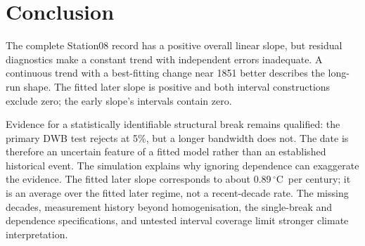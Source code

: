 \documentclass[11pt,a4paper]{article}
\newcommand{\degC}{\ensuremath{^{\circ}\mathrm C}}
\begin{document}
\section{Conclusion}
The complete Station08 record has a positive overall linear slope, but residual diagnostics make a constant trend with independent errors inadequate. A continuous trend with a best-fitting change near 1851 better describes the long-run shape. The fitted later slope is positive and both interval constructions exclude zero; the early slope's intervals contain zero.

Evidence for a statistically identifiable structural break remains qualified: the primary DWB test rejects at 5\%, but a longer bandwidth does not. The date is therefore an uncertain feature of a fitted model rather than an established historical event. The simulation explains why ignoring dependence can exaggerate the evidence. The fitted later slope corresponds to about 0.89\,\degC\ per century; it is an average over the fitted later regime, not a recent-decade rate. The missing decades, measurement history beyond homogenisation, the single-break and dependence specifications, and untested interval coverage limit stronger climate interpretation.
\end{document}
